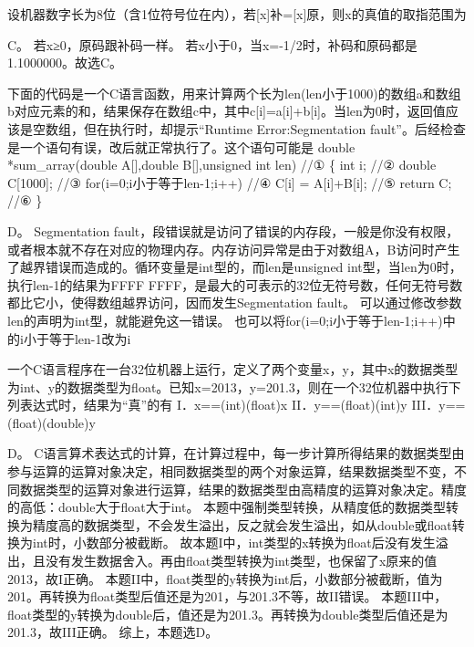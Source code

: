 \question 设机器数字长为8位（含1位符号位在内），若{[}x{]}补={[}x{]}原，则x的真值的取指范围为
\par{}
\begin{solution}C。 若x≥0，原码跟补码一样。
若x小于0，当x=-1/2时，补码和原码都是1.1000000。故选C。
\end{solution}
\question 下面的代码是一个C语言函数，用来计算两个长为len(len小于1000)的数组a和数组b对应元素的和，结果保存在数组c中，其中c{[}i{]}=a{[}i{]}+b{[}i{]}。当len为0时，返回值应该是空数组，但在执行时，却提示``Runtime
Error:Segmentation
fault''。后经检查是一个语句有误，改后就正常执行了。这个语句可能是 double
*sum\_array(double A{[}{]},double B{[}{]},unsigned int len) //① \{ int
i; //② double C{[}1000{]}; //③ for(i=0;i小于等于len-1;i++) //④ C{[}i{]}
= A{[}i{]}+B{[}i{]}; //⑤ return C; //⑥ \}
\par{}
\begin{solution}D。 Segmentation
fault，段错误就是访问了错误的内存段，一般是你没有权限，或者根本就不存在对应的物理内存。内存访问异常是由于对数组A，B访问时产生了越界错误而造成的。循环变量是int型的，而len是unsigned
int型，当len为0时，执行len-1的结果为FFFF
FFFF，是最大的可表示的32位无符号数，任何无符号数都比它小，使得数组越界访问，因而发生Segmentation
fault。 可以通过修改参数len的声明为int型，就能避免这一错误。
也可以将for(i=0;i小于等于len-1;i++)中的i小于等于len-1改为i
\end{solution}
\question 一个C语言程序在一台32位机器上运行，定义了两个变量x，y，其中x的数据类型为int、y的数据类型为float。已知x=2013，y=201.3，则在一个32位机器中执行下列表达式时，结果为``真''的有
I．x==(int)(float)x II．y==(float)(int)y III．y==(float)(double)y
\par{}
\begin{solution}D。
C语言算术表达式的计算，在计算过程中，每一步计算所得结果的数据类型由参与运算的运算对象决定，相同数据类型的两个对象运算，结果数据类型不变，不同数据类型的运算对象进行运算，结果的数据类型由高精度的运算对象决定。精度的高低：double大于float大于int。
本题中强制类型转换，从精度低的数据类型转换为精度高的数据类型，不会发生溢出，反之就会发生溢出，如从double或float转换为int时，小数部分被截断。
故本题I中，int类型的x转换为float后没有发生溢出，且没有发生数据舍入。再由float类型转换为int类型，也保留了x原来的值2013，故I正确。
本题II中，float类型的y转换为int后，小数部分被截断，值为201。再转换为float类型后值还是为201，与201.3不等，故II错误。
本题III中，float类型的y转换为double后，值还是为201.3。再转换为double类型后值还是为201.3，故III正确。
综上，本题选D。
\end{solution}
